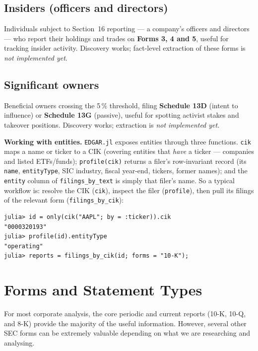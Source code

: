 \documentclass[11pt,a4paper]{report}
\begin{document}
\subsection{Insiders (officers and directors)}
Individuals subject to Section~16 reporting --- a company's officers and directors --- who report their
holdings and trades on \textbf{Forms 3, 4 and 5}, useful for tracking insider activity. Discovery works;
fact-level extraction of these forms is \emph{not implemented yet}.

\subsection{Significant owners}
Beneficial owners crossing the 5\,\% threshold, filing \textbf{Schedule 13D} (intent to influence) or
\textbf{Schedule 13G} (passive), useful for spotting activist stakes and takeover positions. Discovery
works; extraction is \emph{not implemented yet}.

\medskip
\noindent \textbf{Working with entities.} \texttt{EDGAR.jl} exposes entities through three functions.
\texttt{cik} maps a name or ticker to a CIK (covering entities that \emph{have} a ticker --- companies and
listed ETFs/funds); \texttt{profile(cik)} returns a filer's row-invariant record (its \texttt{name},
\texttt{entityType}, SIC industry, fiscal year-end, tickers, former names); and the \texttt{entity} column
of \texttt{filings\_by\_text} is simply that filer's name. So a typical workflow is: resolve the CIK
(\texttt{cik}), inspect the filer (\texttt{profile}), then pull its filings of the relevant form
(\texttt{filings\_by\_cik}):

\begin{lstlisting}
julia> id = only(cik("AAPL"; by = :ticker)).cik
"0000320193"
julia> profile(id).entityType
"operating"
julia> reports = filings_by_cik(id; forms = "10-K");
\end{lstlisting}

\section{Forms and Statement Types}\label{sec:edgar-forms}

For most corporate analysis, the core periodic and current reports (10-K, 10-Q, and 8-K) provide the majority of the useful information. However, several other SEC forms can be extremely valuable depending on what we are researching and analysing.
\end{document}
